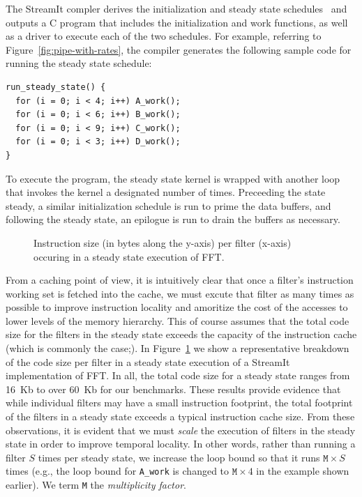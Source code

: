 The StreamIt compler derives the initialization and steady state
schedules~\cite{karczma-lctes03} and outputs a C program that includes
the initialization and work functions, as well as a driver to execute
each of the two schedules. For example, referring to
Figure~\ref{fig:pipe-with-rates}, the compiler generates the following
sample code for running the steady state schedule:
\begin{verbatim}
run_steady_state() {
  for (i = 0; i < 4; i++) A_work();
  for (i = 0; i < 6; i++) B_work();
  for (i = 0; i < 9; i++) C_work();
  for (i = 0; i < 3; i++) D_work();
}
\end{verbatim}
To execute the program, the steady state kernel is wrapped with
another loop that invokes the kernel a designated number of
times. Preceeding the state steady, a similar initialization schedule
is run to prime the data buffers, and following the steady state, an
epilogue is run to drain the buffers as necessary.

\begin{figure}[t]
\begin{center}
 \caption{Instruction size (in bytes along the y-axis) per filter
 (x-axis) occuring in a steady state execution of FFT.}
 \label{fig:ssi-single}
\end{center}
\end{figure}

From a caching point of view, it is intuitively clear that once a
filter's instruction working set is fetched into the cache, we must
excute that filter as many times as possible to improve instruction
locality and amoritize the cost of the accesses to lower levels of the
memory hierarchy. This of course assumes that the total code size for
the filters in the steady state exceeds the capacity of the
instruction cache (which is commonly the case;). In
Figure~\ref{fig:ssi-single} we show a representative breakdown of the
code size per filter in a steady state execution of a StreamIt
implementation of FFT. In all, the total code size for a steady state
ranges from 16~Kb to over 60~Kb for our benchmarks. These results
provide evidence that while individual filters may have a
small instruction footprint, the total footprint of the filters in a
steady state exceeds a typical instruction cache size.
From these observations, it is evident that we must {\it scale} the
execution of filters in the steady state in order to improve temporal
locality. In other words, rather than running a filter $S$ times per
steady state, we increase the loop bound so that it runs $\texttt{M}
\times S$ times (e.g., the loop bound for \verb+A_work+ is
changed to $\texttt{M} \times 4$ in the example shown earlier). 
We term \texttt{M} the {\it multiplicity factor}.

